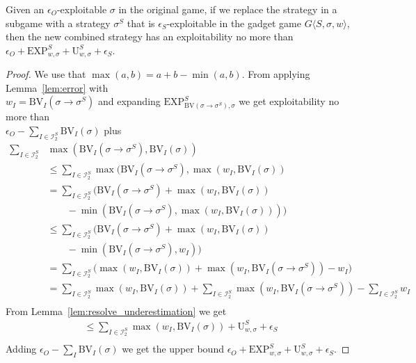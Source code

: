 \begin{lemma}
  Given an $\epsilon_O$-exploitable $\sigma$ in the original game, if
  we replace the strategy in a subgame with a strategy $\sigma^S$ that
  is $\epsilon_S$-exploitable in the gadget game $G\langle S, \sigma,
  w\rangle$, then the new combined strategy has an exploitability no
  more than $\epsilon_O + \text{EXP}^S_{w,\sigma} +
  \text{U}^S_{w,\sigma} + \epsilon_S$.
  \label{lem:resolve_error}
\end{lemma}
\begin{proof}
  We use that $\max(a,b) = a + b - \min(a,b)$. From applying Lemma~\ref{lem:error} with\\ 
  ${w_I = \text{BV}_I(\sigma \to \sigma^S)}$ and expanding 
  ${\text{EXP}^S_{\text{BV}(\sigma \to \sigma^S),\sigma}}$ 
  we get exploitability no more than\\ ${\epsilon_O
  - \sum_{I \in \mathcal{I}^S_2} \text{BV}_I( \sigma )}$ plus
  \begin{align*}
    \sum_{I \in \mathcal{I}^S_2} &\max( \text{BV}_I( \sigma \to \sigma^S), \text{BV}_I( \sigma ) )  \\
    &\le \sum_{I \in \mathcal{I}^S_2} \max( \text{BV}_I( \sigma \to \sigma^S ), \max( w_I, \text{BV}_I( \sigma ) )  \\
    &= \sum_{I \in \mathcal{I}^S_2} \bigl( \text{BV}_I( \sigma \to \sigma^S ) + \max( w_I, \text{BV}_I( \sigma )) \\
    &\qquad - \min( \text{BV}_I( \sigma \to \sigma^S ), \max( w_I, \text{BV}_I( \sigma ))) \bigr)\\
    &\leq \sum_{I \in \mathcal{I}^S_2} \bigl( \text{BV}_I( \sigma \to \sigma^S ) + \max( w_I, \text{BV}_I( \sigma )) \\
    &\qquad - \min( \text{BV}_I( \sigma \to \sigma^S ), w_I) \bigr)\\
    &= \sum_{I \in \mathcal{I}^S_2} \bigl( \max( w_I, \text{BV}_I( \sigma )) + \max( w_I, \text{BV}_I( \sigma\to\sigma^S ) ) - w_I \bigr) \\
    &= \sum_{I \in \mathcal{I}^S_2} \max( w_I, \text{BV}_I( \sigma ) ) + \sum_{I \in \mathcal{I}^S_2} \max( w_I, \text{BV}_I( \sigma\to\sigma^S ))  - \sum_{I \in \mathcal{I}^S_2} w_I \\
  \end{align*}
  From Lemma~\ref{lem:resolve_underestimation} we get
  \begin{align*}
    \le \sum_{I \in \mathcal{I}^S_2} \max( w_I, \text{BV}_I( \sigma ) ) + \text{U}^S_{w,\sigma} + \epsilon_S \\
  \end{align*}
  Adding $\epsilon_O - \sum_I \text{BV}_I( \sigma )$ we get the
  upper bound $\epsilon_O + \text{EXP}^S_{w,\sigma} + \text{U}^S_{w,\sigma} + \epsilon_S$.
\end{proof}

